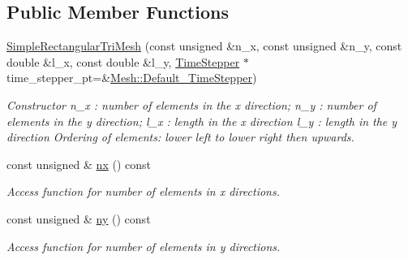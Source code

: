 \subsection*{Public Member Functions}
\begin{DoxyCompactItemize}
\item 
\hyperlink{classoomph_1_1SimpleRectangularTriMesh_a4a4e728bd6245b820d4698de28ee7d38}{Simple\+Rectangular\+Tri\+Mesh} (const unsigned \&n\+\_\+x, const unsigned \&n\+\_\+y, const double \&l\+\_\+x, const double \&l\+\_\+y, \hyperlink{classoomph_1_1TimeStepper}{Time\+Stepper} $\ast$time\+\_\+stepper\+\_\+pt=\&\hyperlink{classoomph_1_1Mesh_a12243d0fee2b1fcee729ee5a4777ea10}{Mesh\+::\+Default\+\_\+\+Time\+Stepper})
\begin{DoxyCompactList}\small\item\em Constructor n\+\_\+x \+: number of elements in the x direction; n\+\_\+y \+: number of elements in the y direction; l\+\_\+x \+: length in the x direction l\+\_\+y \+: length in the y direction Ordering of elements\+: \textquotesingle{}lower left\textquotesingle{} to \textquotesingle{}lower right\textquotesingle{} then \textquotesingle{}upwards\textquotesingle{}. \end{DoxyCompactList}\item 
const unsigned \& \hyperlink{classoomph_1_1SimpleRectangularTriMesh_ac8fcc898b00209b300684dd8addd9b4f}{nx} () const
\begin{DoxyCompactList}\small\item\em Access function for number of elements in x directions. \end{DoxyCompactList}\item 
const unsigned \& \hyperlink{classoomph_1_1SimpleRectangularTriMesh_a39f3713497e6c9fef258d5f239ad5d3b}{ny} () const
\begin{DoxyCompactList}\small\item\em Access function for number of elements in y directions. \end{DoxyCompactList}\end{DoxyCompactItemize}
